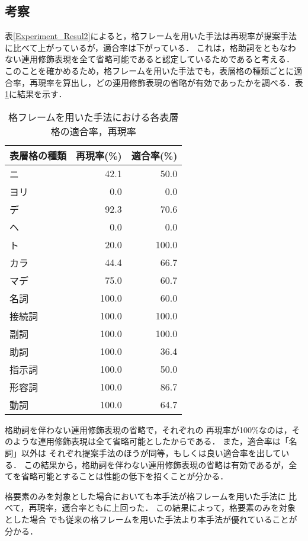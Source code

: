 \subsection{考察}
表\ref{Experiment_Resul2}によると，格フレームを用いた手法は再現率が提案手法に比べて上がっているが，適合率は下がっている．
これは，格助詞をともなわない連用修飾表現を全て省略可能であると認定しているためであると考える．
このことを確かめるため，格フレームを用いた手法でも，表層格の種類ごとに適合率，再現率を算出し，どの連用修飾表現の省略が有効であったかを調べる．表\ref{result_pre2}に結果を示す．
\begin{table}[bt]
\begin{center}
\caption{格フレームを用いた手法における各表層格の適合率，再現率} \label{result_pre2}
\begin{tabular}{l|r|r}
\hline
 表層格の種類 & 再現率(\%) & 適合率(\%) \\
\hline \hline
ニ & 42.1 & 50.0 \\
ヨリ & 0.0 & 0.0 \\
デ & 92.3 & 70.6 \\
ヘ & 0.0 & 0.0 \\
ト & 20.0 & 100.0 \\
カラ & 44.4 & 66.7 \\
マデ & 75.0 & 60.7 \\ \hline
名詞 & 100.0 & 60.0 \\
接続詞 & 100.0 & 100.0 \\
副詞 & 100.0 & 100.0 \\
助詞 & 100.0 & 36.4 \\
指示詞 & 100.0 & 50.0 \\
形容詞 & 100.0 & 86.7 \\
動詞 & 100.0 & 64.7 \\
\hline
\end{tabular}
\end{center}
\end{table}
格助詞を伴わない連用修飾表現の省略で，それぞれの
再現率が100\%なのは，そのような連用修飾表現は全て省略可能としたからである．
また，適合率は「名詞」以外は
それぞれ提案手法のほうが同等，もしくは良い適合率を出している．
この結果から，格助詞を伴わない連用修飾表現の省略は有効であるが，全てを省略可能とすることは性能の低下を招くことが分かる．


格要素のみを対象とした場合においても本手法が格フレームを用いた手法に
比べて，再現率，適合率ともに上回った．
この結果によって，格要素のみを対象とした場合
でも従来の格フレームを用いた手法より本手法が優れていることが分かる．


